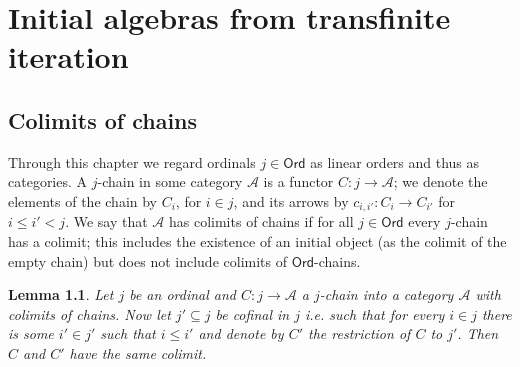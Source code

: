 \documentclass[letterpaper, 11pt, oneside]{memoir}
\theoremstyle{myteo}
\newtheorem{lemma}[theorem]{Lemma}
\numberwithin{equation}{section}
\newcommand{\marginnote}[1]{\marginpar{\footnotesize #1}}
\newcommand{\Ord}{\textsf{Ord}}
\newcommand{\A}{\mathscr{A}}
\begin{document}
\chapter{Initial algebras from transfinite iteration}
\newpage

\section{Colimits of chains}

Through this chapter we regard ordinals \(j \in \Ord\) as linear orders and thus as categories.
A \(j\)-chain in some category \(\A\) is a functor \(C : j \to \A \)\marginnote{\(j\)-chain}; we denote the elements of the chain by \(C_i\), for \(i \in j\), and its arrows by \(c_{i,i'} : C_i \to C_{i'}\) for \(i \leq i' < j\).
We say that \(\A\) has colimits of chains if for all \(j \in \Ord\) every \(j\)-chain has a colimit; this includes the existence of an initial object (as the colimit of the empty chain) but does not include colimits of \(\Ord\)-chains.

\begin{lemma}
  \label{lemma:final_functors}
  Let \(j\) be an ordinal and \(C : j \to \A\) a \(j\)-chain into a category \(\A\) with colimits of chains.
  Now let \(j' \subseteq j\) be cofinal in \(j\) i.e. such that for every \(i \in j\) there is some \(i' \in j'\) such that \(i \leq i'\) and denote by \(C'\) the restriction of \(C\) to \(j'\).
  Then \(C\) and \(C'\) have the same colimit.
\end{lemma}
\end{document}
